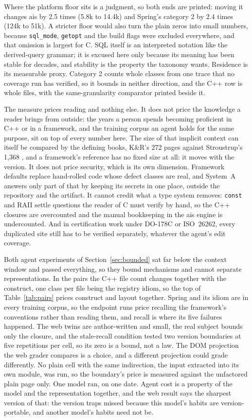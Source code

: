 \documentclass[journal]{IEEEtran}
\begin{document}
Where the platform floor sits is a judgment, so both ends are printed:
moving it changes ais by 2.5 times (5.8k to 14.4k) and Spring's category
2 by 2.4 times (124k to 51k). A stricter floor would also turn the plain
zeros into small numbers, because \texttt{sql\_mode}, \texttt{getopt}
and the build flags were excluded everywhere, and that omission is
largest for C. SQL itself is an interpreted notation like the
derived-query grammar; it is excused here only because its meaning has
been stable for decades, and stability is the property the taxonomy
wants. Residence is its measurable proxy. Category 2 counts
whole classes from one trace that no coverage run has verified, so it
bounds in neither direction, and the C++ row is whole files, with the
same-granularity comparator printed beside it.

The measure prices reading and nothing else. It does not price the
knowledge a reader brings from outside: the years a person spends
becoming proficient in C++ or in a framework, and the training corpus an
agent holds for the same purpose, sit on top of every number here. The
size of that implicit context can itself be compared by the defining
books, K\&R's 272 pages against Stroustrup's 1,368 \cite{knr,stroustrup},
and a framework's reference has no fixed size at all: it moves with the
version. It
does not price security, which is its own dimension. Framework defaults
replace hand-rolled code whose defect classes are real, and System~A
answers only part of that by keeping its secrets in one place, outside
the repository and the artifact. It cannot credit what a type system
removes: \texttt{const} and RAII settle questions the reader of C must
verify by hand, so the C++ closures are overcounted and the manual
bookkeeping in the ais engine is undercounted. And in certification work
under DO-178C or ISO~26262, every duplicated site still has to be
verified separately, whatever the agent's edit coverage.

Both agent experiments of Section~\ref{sec:bounded} sat far below the context window and
passed everything, so they bound mechanisms and cannot separate
representations. In the pairs the C++ file count changes together with
the construct, one class per file being the registry idiom, so the top
of Table~\ref{tab:pairs} prices construct and layout together. Spring
and its idiom are in every training corpus, so the endpoint runs price
recalling the framework's conventions rather than reading them, and
recall is where its five failures happened. The web twins are
author-written and small, the real subject bounds only the closure, and
the stale-recall condition tested two version boundaries at five
repetitions per cell, so its zero is a bound, not a law. The DOM
projection the web grader compares is a choice, and a different
projection could grade differently. No plain cell with the same
indirection, the input extracted into its own module, was run, so the
boundary's price is measured against the unfactored plain page only. One model ran, on one date.
Agent cost is a property of the model and the representation together,
and the web result says the sharpest version of that: the version traps
missed because this model's habits are version-portable, and another
model's habits need not be.
\end{document}
